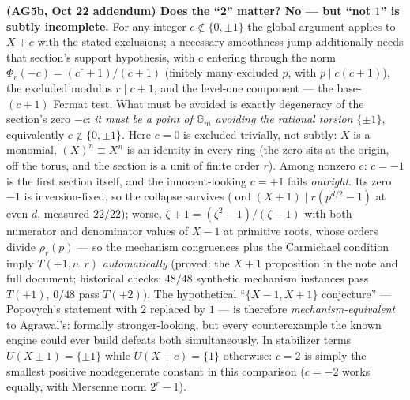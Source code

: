 \documentclass[10pt]{article}
\DeclareMathOperator{\ord}{ord}
\begin{document}
\textbf{(AG5b, Oct 22 addendum) Does the ``2'' matter? No --- but ``not
$1$'' is subtly incomplete.} For any integer $c \notin \{0, \pm 1\}$ the
global argument applies to $X+c$ with the stated exclusions; a necessary
smoothness jump additionally needs that section's support hypothesis,
with $c$ entering through the norm
$\Phi_r(-c) = (c^r{+}1)/(c{+}1)$ (finitely many excluded $p$, with
$p \mid c(c{+}1)$), the excluded modulus $r \mid c{+}1$, and the level-one
component --- the base-$(c{+}1)$ Fermat test. What must be avoided is
exactly degeneracy of the section's zero $-c$: \emph{it must be a point of
$\mathbb{G}_m$ avoiding the rational torsion $\{\pm 1\}$}, equivalently
$c \notin \{0, \pm 1\}$. Here $c = 0$ is excluded trivially, not subtly:
$X$ is a monomial, $(X)^n \equiv X^n$ is an identity in every ring (the
zero sits at the origin, off the torus, and the section is a unit of
finite order $r$). Among nonzero $c$: $c = -1$ is the first section
itself, and the innocent-looking $c = +1$
fails \emph{outright}. Its zero $-1$ is inversion-fixed, so the collapse
survives ($\ord(X{+}1) \mid r(p^{d/2}{-}1)$ at even $d$, measured
$22/22$); worse, $\zeta{+}1 = (\zeta^2{-}1)/(\zeta{-}1)$ with both
numerator and denominator values of $X - 1$ at primitive roots, whose
orders divide $\rho_r(p)$ --- so the mechanism congruences plus the
Carmichael condition imply $T(+1, n, r)$ \emph{automatically} (proved:
the $X+1$ proposition in the note and full document; historical checks: $48/48$
synthetic mechanism instances pass $T(+1)$, $0/48$ pass $T(+2)$). The
hypothetical ``$\{X{-}1, X{+}1\}$ conjecture'' --- Popovych's statement
with $2$ replaced by $1$ --- is therefore \emph{mechanism-equivalent} to
Agrawal's: formally stronger-looking, but every counterexample the known
engine could ever build defeats both simultaneously. In stabilizer terms
$U(X \pm 1) = \{\pm 1\}$ while $U(X + c) = \{1\}$ otherwise: $c = 2$ is
simply the smallest positive nondegenerate constant in this comparison ($c = -2$
works equally, with Mersenne norm $2^r - 1$).
\end{document}
